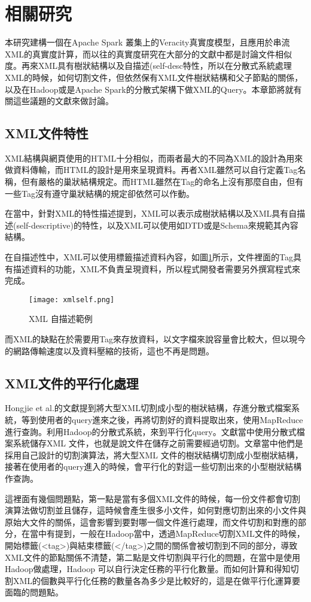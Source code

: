\section{相關研究}
本研究建構一個在Apache Spark 叢集上的Veracity真實度模型，且應用於串流XML的真實度計算，而以往的真實度研究在大部分的文獻中都是討論文件相似度。再來XML具有樹狀結構以及自描述(self-desc特性，所以在分散式系統處理XML的時候，如何切割文件，但依然保有XML文件樹狀結構和父子節點的關係，以及在Hadoop或是Apache Spark的分散式架構下做XML的Query。本章節將就有關這些議題的文獻來做討論。
\subsection{XML文件特性}
XML結構與網頁使用的HTML十分相似，而兩者最大的不同為XML的設計為用來做資料傳輸，而HTML的設計是用來呈現資料。再者XML雖然可以自行定義Tag名稱，但有嚴格的巢狀結構規定。而HTML雖然在Tag的命名上沒有那麼自由，但有一些Tag沒有遵守巢狀結構的規定卻依然可以作動。\\\par
在\cite{w3sxml}\cite{2005xml}當中，針對XML的特性描述提到，XML可以表示成樹狀結構以及XML具有自描述(self-descriptive)的特性，以及XML可以使用如DTD或是Schema來規範其內容結構。\\\par
在自描述性中，XML可以使用標籤描述資料內容，如圖\ref{self}所示，文件裡面的Tag具有描述資料的功能，XML不負責呈現資料，所以程式開發者需要另外撰寫程式來完成。

\begin{figure}[H]
\centering
\graphicspath{{/Users/FUDA/Documents/masterThesis/image/}}
\texttt{[image: xmlself.png]}
\caption{XML 自描述範例}
\label{self}
\end{figure}
而XML的缺點在於需要用Tag來存放資料，以文字檔來說容量會比較大，但以現今的網路傳輸速度以及資料壓縮的技術，這也不再是問題。
\subsection{XML文件的平行化處理}
Hongjie et al.的文獻\cite{fan2018handling}提到將大型XML切割成小型的樹狀結構，存進分散式檔案系統，等到使用者的query進來之後，再將切割好的資料提取出來，使用MapReduce進行查詢。利用Hadoop的分散式系統，來到平行化query。文獻當中使用分散式檔案系統儲存XML 文件，也就是說文件在儲存之前需要經過切割。文章當中他們是採用自己設計的切割演算法，將大型XML 文件的樹狀結構切割成小型樹狀結構，接著在使用者的query進入的時候，會平行化的對這一些切割出來的小型樹狀結構作查詢。\\\par
這裡面有幾個問題點，第一點是當有多個XML文件的時候，每一份文件都會切割演算法做切割並且儲存，這時候會產生很多小文件，如何對應切割出來的小文件與原始大文件的關係，這會影響到要對哪一個文件進行處理，而文件切割和對應的部分，在\cite{eiffcientXML}當中有提到，一般在Hadoop當中，透過MapReduce切割XML文件的時候，開始標籤(<tag>)與結束標籤(</tag>)之間的關係會被切割到不同的部分，導致XML文件的節點關係不清楚，第二點是文件切割與平行化的問題，在\cite{fan2018handling}當中是使用Hadoop做處理，Hadoop 可以自行決定任務的平行化數量。而如何計算和得知切割XML的個數與平行化任務的數量各為多少是比較好的，這是在做平行化運算要面臨的問題點。\\\par

